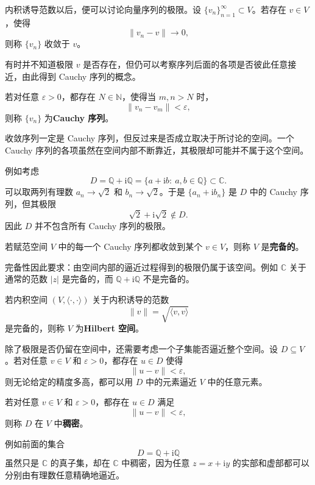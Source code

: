 \documentclass[UTF8,a4paper,11pt,openany]{ctexbook}
\begin{document}
内积诱导范数以后，便可以讨论向量序列的极限。设 $\{v_n\}_{n=1}^{\infty}\subset V$。若存在 $v\in V$，使得
\[
\|v_n-v\|\longrightarrow 0,
\]
则称 $\{v_n\}$ 收敛于 $v$。

有时并不知道极限 $v$ 是否存在，但仍可以考察序列后面的各项是否彼此任意接近，由此得到 Cauchy 序列的概念。

\begin{definition}[Cauchy 序列]
若对任意 $\varepsilon>0$，都存在 $N\in\mathbb N$，使得当 $m,n>N$ 时，
\[
\|v_n-v_m\|<\varepsilon,
\]
则称 $\{v_n\}$ 为\textbf{Cauchy 序列}。
\end{definition}

收敛序列一定是 Cauchy 序列，但反过来是否成立取决于所讨论的空间。一个 Cauchy 序列的各项虽然在空间内部不断靠近，其极限却可能并不属于这个空间。

例如考虑
\[
D
=
\mathbb Q+\mathrm{i}\mathbb Q
=
\{a+\mathrm{i}b:\ a,b\in\mathbb Q\}
\subset\mathbb C.
\]
可以取两列有理数 $a_n\to\sqrt{2}$ 和 $b_n\to\sqrt{2}$。于是 $\{a_n+\mathrm{i}b_n\}$ 是 $D$ 中的 Cauchy 序列，但其极限
\[
\sqrt{2}+\mathrm{i}\sqrt{2}
\notin D.
\]
因此 $D$ 并不包含所有 Cauchy 序列的极限。

\begin{definition}[完备空间]
若赋范空间 $V$ 中的每一个 Cauchy 序列都收敛到某个 $v\in V$，则称 $V$ 是\textbf{完备的}。
\end{definition}

完备性因此要求：由空间内部的逼近过程得到的极限仍属于该空间。例如 $\mathbb C$ 关于通常的范数 $|z|$ 是完备的，而 $\mathbb Q+\mathrm{i}\mathbb Q$ 不是完备的。

\begin{definition}[Hilbert 空间]
若内积空间 $(V,\langle\cdot,\cdot\rangle)$ 关于内积诱导的范数
\[
\|v\|
=
\sqrt{\langle v,v\rangle}
\]
是完备的，则称 $V$ 为\textbf{Hilbert 空间}。
\end{definition}

除了极限是否仍留在空间中，还需要考虑一个子集能否逼近整个空间。设 $D\subseteq V$。若对任意 $v\in V$ 和 $\varepsilon>0$，都存在 $u\in D$ 使得
\[
\|u-v\|<\varepsilon,
\]
则无论给定的精度多高，都可以用 $D$ 中的元素逼近 $V$ 中的任意元素。

\begin{definition}[稠密子集]
若对任意 $v\in V$ 和 $\varepsilon>0$，都存在 $u\in D$ 满足
\[
\|u-v\|<\varepsilon,
\]
则称 $D$ 在 $V$ 中\textbf{稠密}。
\end{definition}

例如前面的集合
\[
D=\mathbb Q+\mathrm{i}\mathbb Q
\]
虽然只是 $\mathbb C$ 的真子集，却在 $\mathbb C$ 中稠密，因为任意 $z=x+\mathrm{i}y$ 的实部和虚部都可以分别由有理数任意精确地逼近。
\end{document}
